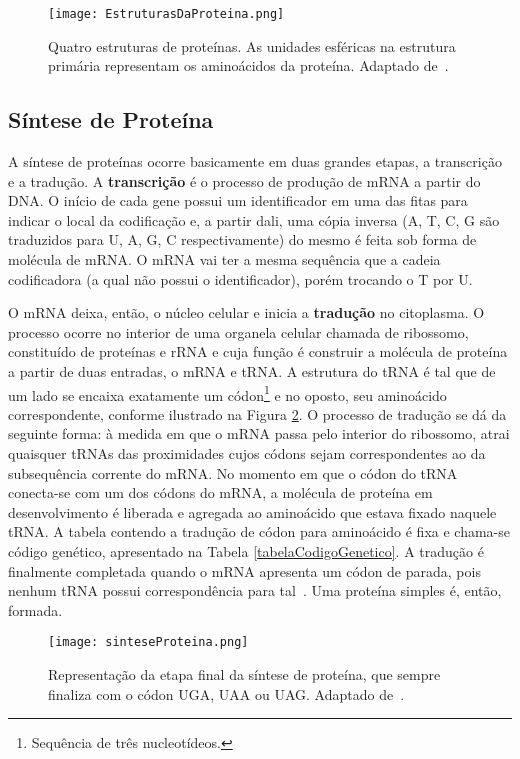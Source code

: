 \begin{figure}[h]
    \centering
    \texttt{[image: EstruturasDaProteina.png]}
    \caption{Quatro estruturas de proteínas. As unidades esféricas na estrutura primária representam os aminoácidos da proteína. Adaptado de~\cite{drug09}.}
    \label{fig:EstruturasDaProteina}
\end{figure}

\subsection{Síntese de Proteína} \label{sinteseDeProteina}

\indent A síntese de proteínas ocorre basicamente em duas grandes etapas, a transcrição e a tradução. A \textbf{transcrição} é o processo de produção de mRNA a partir do DNA. O início de cada gene possui um identificador em uma das fitas para indicar o local da codificação e, a partir dali, uma cópia inversa (A, T, C, G são traduzidos para U, A, G, C respectivamente) do mesmo é feita sob forma de molécula de mRNA. O mRNA vai ter a mesma sequência que a cadeia codificadora (a qual não possui o identificador), porém trocando o T por U.

\indent O mRNA deixa, então, o núcleo celular e inicia a \textbf{tradução} no citoplasma. O processo ocorre no interior de uma organela celular chamada de ribossomo, constituído de proteínas e rRNA e cuja função é construir a molécula de proteína a partir de duas entradas, o mRNA e tRNA. A estrutura do tRNA é tal que de um lado se encaixa exatamente um códon\footnote{Sequência de três nucleotídeos.} e no oposto, seu aminoácido correspondente, conforme ilustrado na Figura \ref{fig:sinteseProteina}. O processo de tradução se dá da seguinte forma: à medida em que o mRNA passa pelo interior do ribossomo, atrai quaisquer tRNAs das proximidades cujos códons sejam correspondentes ao da subsequência corrente do mRNA. No momento em que o códon do tRNA conecta-se com um dos códons do mRNA, a molécula de proteína em desenvolvimento é liberada e agregada ao aminoácido que estava fixado naquele tRNA. A tabela contendo a tradução de códon para aminoácido é fixa e chama-se código genético, apresentado na Tabela \ref{tabelaCodigoGenetico}. A tradução é finalmente completada quando o mRNA apresenta um códon de parada, pois nenhum tRNA possui correspondência para tal~\cite{setubal97}. Uma proteína simples é, então, formada. 

\begin{figure}[h]
    \centering
    \texttt{[image: sinteseProteina.png]}
    \caption{Representação da etapa final da síntese de proteína, que sempre finaliza com o códon UGA, UAA ou UAG. Adaptado de~\cite{proteinSyntesis}.}
    \label{fig:sinteseProteina}
\end{figure} 

